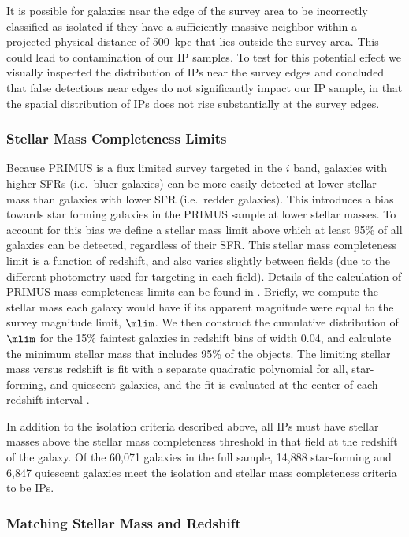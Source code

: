 It is possible for galaxies near the edge of the survey area to be incorrectly classified as isolated if they have a sufficiently massive neighbor within a projected physical distance of 500~kpc that lies outside the survey area.
This could lead to contamination of our IP samples.
To test for this potential effect we visually inspected the distribution of IPs near the survey edges and concluded that false detections near edges do not significantly impact our IP sample, in that the spatial distribution of IPs does not rise substantially at the survey edges. 

\subsubsection{Stellar Mass Completeness Limits}\label{sec:mass_limit}

Because PRIMUS is a flux limited survey targeted in the $i$ band, galaxies with higher SFRs (i.e.~bluer galaxies) can be more easily detected at lower stellar mass than galaxies with lower SFR (i.e.~redder galaxies).
This introduces a bias towards star forming galaxies in the PRIMUS sample at lower stellar masses.
To account for this bias we define a stellar mass limit above which at least 95\% of all galaxies can be detected, regardless of their SFR.
This stellar mass completeness limit is a function of redshift, and also varies slightly between fields (due to the different photometry used for targeting in each field).
Details of the calculation of PRIMUS mass completeness limits can be found in \citet{Moustakas13}.
Briefly, we compute the stellar mass each galaxy would have if its apparent magnitude were equal to the survey magnitude limit, $\mlim$.  We then construct the cumulative distribution of $\mlim$ for the 15\% faintest galaxies in redshift bins of width 0.04, and calculate the minimum stellar mass that includes 95\% of the objects.  The limiting stellar mass versus redshift is fit with a separate quadratic polynomial for all, star-forming, and quiescent galaxies, and the fit is evaluated at the center of each redshift interval \citep[see][]{Moustakas13}.

In addition to the isolation criteria described above, all IPs must have stellar masses above the stellar mass completeness threshold in that field at the redshift of the galaxy. 
Of the 60,071 galaxies in the full sample, 14,888 star-forming and 6,847 quiescent galaxies meet the isolation and stellar mass completeness criteria to be IPs.


\subsubsection{Matching Stellar Mass and Redshift}\label{sec:IPsample_matching}

